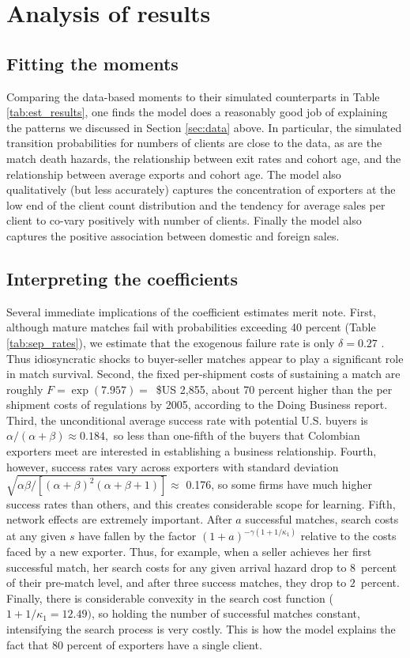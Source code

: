\section{Analysis of results}

\subsection{Fitting the moments}

Comparing the data-based moments to their simulated counterparts in Table \ref{tab:est_results},
one finds the model does a reasonably good job of explaining the patterns we
discussed in Section \ref{sec:data} above. In particular, the simulated transition
probabilities for numbers of clients are close to the data, as are the match
death hazards, the relationship between exit rates and cohort age, and the
relationship between average exports and cohort age. The model also
qualitatively (but less accurately) captures the concentration of exporters
at the low end of the client count distribution and the tendency for average
sales per client to co-vary positively with number of clients. Finally the
model also captures the positive association between domestic and foreign
sales.

\subsection{Interpreting the coefficients}

Several immediate implications of the coefficient estimates merit note.
First, although mature matches fail with probabilities exceeding 40 percent
(Table \ref{tab:sep_rates}), we estimate that the exogenous failure rate is only $\delta =0.27$%
. Thus idiosyncratic shocks to buyer-seller matches appear to play a
significant role in match survival. Second, the fixed per-shipment costs of
sustaining a match are roughly $F=\exp (7.957)=$\ \$US 2,855, about 70 percent
higher than the per shipment costs of regulations by 2005, according to the
Doing Business report. Third, the unconditional average success rate with
potential U.S. buyers is \ $\alpha /(\alpha +\beta )\approx 0.184,$ so less
than one-fifth of the buyers that Colombian exporters meet are interested in
establishing a business relationship. Fourth, however, success rates vary
across exporters with standard deviation\ $\sqrt{\alpha \beta /\left[
(\alpha +\beta )^{2}(\alpha +\beta +1)\right] }\approx $ 0.176, so some
firms have much higher success rates than others, and this creates
considerable scope for learning. Fifth, network effects are extremely
important. After $a$ successful matches, search costs at any given $s$ have
fallen by the factor $(1+a)^{-\gamma (1+1/\kappa _{1})}$ relative to the
costs faced by a new exporter. Thus, for example, when a seller achieves her
first successful match, her search costs for any given arrival hazard drop
to 8\ percent of their pre-match level, and after three success matches,
they drop to $2$\ percent. Finally, there is considerable convexity in the
search cost function ($1+1/\kappa _{1}=12.49)$, so holding the number of
successful matches constant, intensifying the search process is very costly.
This is how the model explains the fact that 80 percent of exporters have a
single client.

